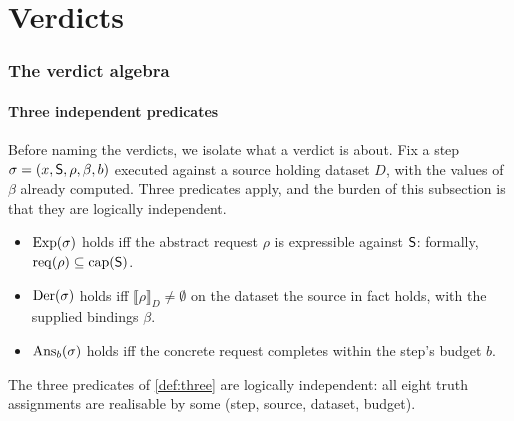 \part{Verdicts}

\section{The verdict algebra}
\label{sec:verdicts}

\subsection{Three independent predicates}

Before naming the verdicts, we isolate what a verdict is about. Fix a step
$\sigma = (x, \mathsf{S}, \rho, \beta, b)$ executed against a source holding dataset
$D$, with the values of $\beta$ already computed. Three predicates apply, and
the burden of this subsection is that they are logically independent.

\begin{definition}
\label{def:three}
\leavevmode
\begin{itemize}[leftmargin=2.4em]
\item $\mathrm{Exp}(\sigma)$ holds iff the abstract request $\rho$ is
expressible against $\mathsf{S}$: formally, $\mathrm{req}(\rho) \subseteq \mathrm{cap}(\mathsf{S})$.
\item $\mathrm{Der}(\sigma)$ holds iff
$\llbracket \rho \rrbracket_D \neq \emptyset$ on the dataset the source in fact
holds, with the supplied bindings $\beta$.
\item $\mathrm{Ans}_b(\sigma)$ holds iff the concrete request completes within
the step's budget $b$.
\end{itemize}
\end{definition}

\begin{proposition}[Independence]
\label{prop:independence}
The three predicates of \cref{def:three} are logically independent: all eight
truth assignments are realisable by some (step, source, dataset, budget).
\end{proposition}

